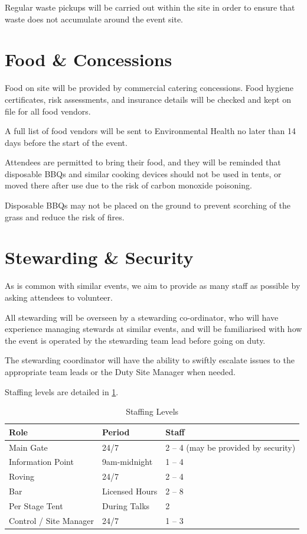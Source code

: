 Regular waste pickups will be carried out within the site in order to ensure that waste does
not accumulate around the event site.

\section{Food \& Concessions}\label{food}

Food on site will be provided by commercial catering concessions. Food hygiene certificates,
risk assessments, and insurance details will be checked and kept on file for all food vendors. 

A full list of food vendors will be sent to Environmental Health no later than 14 days before
the start of the event.

Attendees are permitted to bring their food, and they will be reminded that disposable BBQs and
similar cooking devices should not be used in tents, or moved there after use due to the risk
of carbon monoxide poisoning.

Disposable BBQs may not be placed on the ground to prevent scorching of the grass
and reduce the risk of fires.

\section{Stewarding \& Security}

As is common with similar events, we aim to provide as many staff as possible
by asking attendees to volunteer. 

All stewarding will be overseen by a stewarding co-ordinator, who
will have experience managing stewards at similar events, and will be familiarised
with how the event is operated by the stewarding team lead before going on duty.

The stewarding coordinator will have the ability to swiftly
escalate issues to the appropriate team leads or the Duty Site Manager when needed.

Staffing levels are detailed in \cref{table:staff}.

\begin{table}[h!]
\caption{Staffing Levels}
\label{table:staff}
\centering
\begin{tabular}{| l l l |}
    \hline
    \textbf{Role} & \textbf{Period} & \textbf{Staff} \\
    \hline
    Main Gate & 24/7 & 2 -- 4 (may be provided by security) \\
    Information Point & 9am-midnight & 1 -- 4 \\
    Roving & 24/7 & 2 -- 4 \\
    Bar & Licensed Hours & 2 -- 8 \\
    Per Stage Tent & During Talks & 2 \\
    Control / Site Manager & 24/7 & 1 -- 3 \\
    \hline
\end{tabular}
\end{table}

